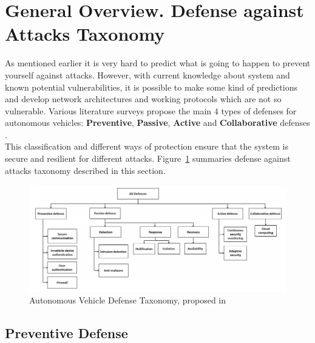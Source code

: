 \section{General Overview. Defense against Attacks Taxonomy}

As mentioned earlier it is very hard to predict what is going to happen to prevent yourself against attacks. However, with current knowledge about system and known potential vulnerabilities, it is possible to make some kind of predictions and develop network architectures and working protocols which are not so vulnerable. Various literature surveys propose the main $4$ types of defenses for autonomous vehicles: \textbf{Preventive}, \textbf{Passive}, \textbf{Active} and \textbf{Collaborative} defenses \cite{secsec}. \\
This classification and different ways of protection ensure that the system is secure and resilient for different attacks. Figure~\ref{fig:DefenseTaxonomy} summaries defense against attacks taxonomy described in this section.

\begin{figure}[h]
	\centering  	
	\includegraphics[width=17cm]{img/7.jpg}
	\caption{Autonomous Vehicle Defense Taxonomy, proposed in \cite{sec}}
	\label{fig:DefenseTaxonomy}    
\end{figure}

\subsection{Preventive Defense}

